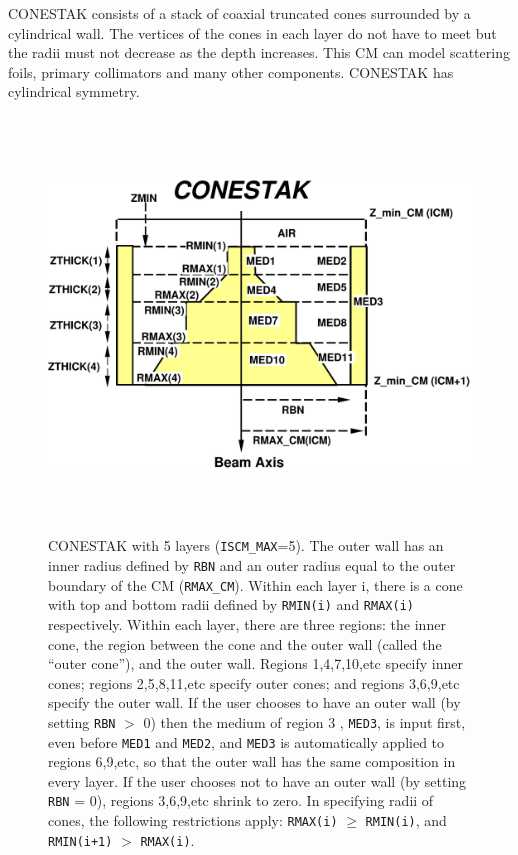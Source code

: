 \documentclass[12pt,twoside]{article}
\begin{document}
CONESTAK consists of a stack of coaxial truncated cones
surrounded by a cylindrical wall.
The vertices of the cones in each layer do not have to meet but the
radii
must not decrease as the depth increases.  This CM can model
scattering foils,  primary collimators and many other components.
CONESTAK has cylindrical symmetry.


\begin{figure}[htbp]
\begin{center}
\leavevmode
\mbox{}\hspace{0cm}
\includegraphics[height=11cm]{figures/conestakd}
\caption[CONESTAK CM geometry]
{CONESTAK with 5 layers ({\tt ISCM\_MAX}=5).  The outer wall has an inner
radius defined by {\tt RBN} and an outer radius equal to the outer boundary of
the CM ({\tt RMAX\_CM}).  Within each layer i, there is a cone with top and
bottom radii defined by {\tt RMIN(i)} and {\tt RMAX(i)} respectively.  Within each
layer, there are three regions: the inner cone, the
region between the cone and the outer wall (called the ``outer cone''), and the
outer
wall.  Regions 1,4,7,10,etc specify inner cones; regions 2,5,8,11,etc specify
outer cones; and regions 3,6,9,etc specify the outer wall.  If the user chooses
to have an outer wall (by setting {\tt RBN} $>$ 0) then the medium of region 3
, {\tt MED3}, is input first, even before {\tt MED1} and {\tt MED2}, and
{\tt MED3} is automatically applied to regions 6,9,etc, so that the outer
wall has the same composition in every layer.  If the user chooses not to
have an outer wall (by setting {\tt RBN} = 0), regions 3,6,9,etc shrink to
zero.
In specifying radii
of cones, the following restrictions apply: {\tt RMAX(i)} $\geq$ {\tt RMIN(i)}, and
{\tt RMIN(i+1)} $>$ {\tt RMAX(i)}.}
\label{fig_CONESTAKD}
\end{center}
\end{figure}
\end{document}
